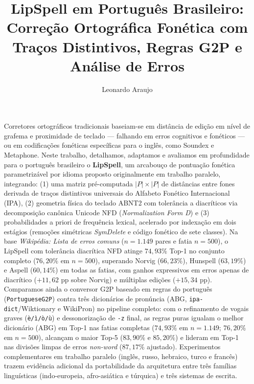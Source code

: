 \documentclass[a4paper, twocolumn, 11pt, twoside]{article}
\title{LipSpell em Português Brasileiro: Correção Ortográfica Fonética com Traços Distintivos, Regras G2P e Análise de Erros}
\author{
  Leonardo Araujo
  \instituto{Universidade Federal de São João del-Rei (UFSJ)}
  \email{leolca@ufsj.edu.br}
}
\begin{document}
\maketitle

\begin{resumo}
Corretores ortográficos tradicionais baseiam-se em distância de edição em nível de grafema e proximidade de teclado --- falhando em erros cognitivos e fonéticos --- ou em codificações fonéticas específicas para o inglês, como Soundex e Metaphone. Neste trabalho, detalhamos, adaptamos e avaliamos em profundidade para o português brasileiro o \textbf{LipSpell}, um arcabouço de pontuação fonética parametrizável por idioma proposto originalmente em trabalho paralelo, integrando: (1) uma matriz pré-computada $|P|\times|P|$ de distâncias entre fones derivada de traços distintivos universais do Alfabeto Fonético Internacional (IPA), (2) geometria física do teclado ABNT2 com tolerância a diacríticos via decomposição canônica Unicode NFD (\textit{Normalization Form D}) e (3) probabilidades a priori de frequência lexical, acelerado por indexação em dois estágios (remoções simétricas \textit{SymDelete} e código fonético de sete classes). Na base \textit{Wikipédia: Lista de erros comuns} ($n=1.149$ pares e fatia $n=500$), o LipSpell com tolerância diacrítica NFD atinge $74{,}93\%$ Top-1 no conjunto completo ($76{,}20\%$ em $n=500$), superando Norvig ($66{,}23\%$), Hunspell ($63{,}19\%$) e Aspell ($60{,}14\%$) em todas as fatias, com ganhos expressivos em erros apenas de diacrítico ($+11{,}62$ pp sobre Norvig) e múltiplas edições ($+15{,}34$ pp). Comparamos ainda o conversor G2P baseado em regras do português (\texttt{PortugueseG2P}) contra três dicionários de pronúncia (ABG, \texttt{ipa-dict}/Wiktionary e WikiPron) no pipeline completo: com o refinamento de vogais graves (\texttt{è/ì/ò/ù}) e dessonorização de \texttt{-z} final, as regras puras igualam o melhor dicionário (ABG) em Top-1 nas fatias completas ($74{,}93\%$ em $n=1.149$; $76{,}20\%$ em $n=500$), alcançam o maior Top-5 ($83{,}90\%$ e $85{,}20\%$) e lideram em Top-1 nas divisões limpas de erros \textit{non-word} ($87{,}17\%$ ajustado). Experimentos complementares em trabalho paralelo (inglês, russo, hebraico, turco e francês) trazem evidência adicional da portabilidade da arquitetura entre três famílias linguísticas (indo-europeia, afro-asiática e túrquica) e três sistemas de escrita.
\end{resumo}

\end{document}
